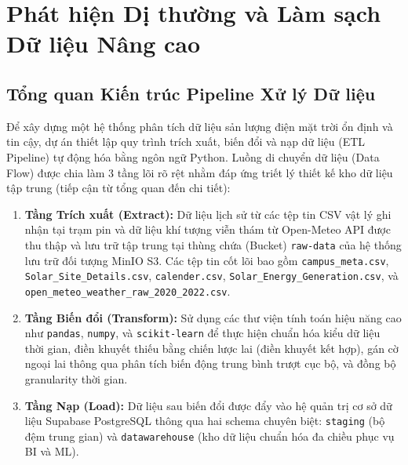 \documentclass[12pt, a4paper]{report}
\begin{document}
\newpage
\chapter{Phát hiện Dị thường và Làm sạch Dữ liệu Nâng cao}
\label{chap:outlier_cleaning}

\section{Tổng quan Kiến trúc Pipeline Xử lý Dữ liệu}
\label{sec:pipeline_overview}

Để xây dựng một hệ thống phân tích dữ liệu sản lượng điện mặt trời ổn định và tin cậy, dự án thiết lập quy trình trích xuất, biến đổi và nạp dữ liệu (ETL Pipeline) tự động hóa bằng ngôn ngữ Python. Luồng di chuyển dữ liệu (Data Flow) được chia làm 3 tầng lõi rõ rệt nhằm đáp ứng triết lý thiết kế kho dữ liệu tập trung (tiếp cận từ tổng quan đến chi tiết):

\begin{enumerate}[noitemsep]
    \item \textbf{Tầng Trích xuất (Extract):} Dữ liệu lịch sử từ các tệp tin CSV vật lý ghi nhận tại trạm pin và dữ liệu khí tượng viễn thám từ Open-Meteo API được thu thập và lưu trữ tập trung tại thùng chứa (Bucket) \texttt{raw-data} của hệ thống lưu trữ đối tượng MinIO S3. Các tệp tin cốt lõi bao gồm \texttt{campus\_meta.csv}, \texttt{Solar\_Site\_Details.csv}, \texttt{calender.csv}, \texttt{Solar\_Energy\_Generation.csv}, và \texttt{open\_meteo\_weather\_raw\_2020\_2022.csv}.
    \item \textbf{Tầng Biến đổi (Transform):} Sử dụng các thư viện tính toán hiệu năng cao như \texttt{pandas}, \texttt{numpy}, và \texttt{scikit-learn} để thực hiện chuẩn hóa kiểu dữ liệu thời gian, điền khuyết thiếu bằng chiến lược lai (điền khuyết kết hợp), gán cờ ngoại lai thông qua phân tích biến động trung bình trượt cục bộ, và đồng bộ granularity thời gian.
    \item \textbf{Tầng Nạp (Load):} Dữ liệu sau biến đổi được đẩy vào hệ quản trị cơ sở dữ liệu Supabase PostgreSQL thông qua hai schema chuyên biệt: \texttt{staging} (bộ đệm trung gian) và \texttt{datawarehouse} (kho dữ liệu chuẩn hóa đa chiều phục vụ BI và ML).
\end{enumerate}
\end{document}
